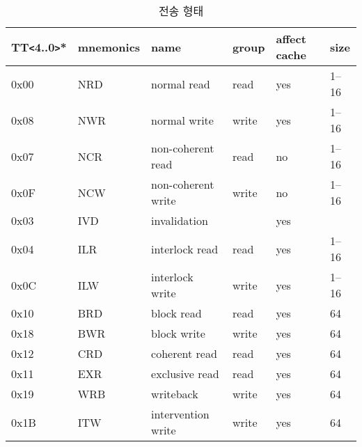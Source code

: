%
%
\begin{table}[htbp]
\caption{전송 형태}
   \begin{center}
   \begin{tabular}{|l|l|l|l|l|l|} \hline
      TT{\tt <}4..0{\tt >}* & mnemonics & name & group & affect cache & size \\ \hline \hline
      0x00 & NRD & normal read        & read  & yes & 1--16 \\ \hline
      0x08 & NWR & normal write       & write & yes & 1--16 \\ \hline
      0x07 & NCR & non-coherent read  & read  & no  & 1--16 \\ \hline
      0x0F & NCW & non-coherent write & write & no  & 1--16 \\ \hline
      0x03 & IVD & invalidation       &       & yes & \\ \hline
      0x04 & ILR & interlock read     & read  & yes & 1--16 \\ \hline
      0x0C & ILW & interlock write    & write & yes & 1--16 \\ \hline
      0x10 & BRD & block read         & read  & yes & 64 \\ \hline
      0x18 & BWR & block write        & write & yes & 64 \\ \hline
      0x12 & CRD & coherent read      & read  & yes & 64 \\ \hline
      0x11 & EXR & exclusive read     & read  & yes & 64 \\ \hline
      0x19 & WRB & writeback          & write & yes & 64 \\ \hline
      0x1B & ITW & intervention write & write & yes & 64 \\ \hline
   \end{tabular}
   \end{center}
\end{table}
%
%
